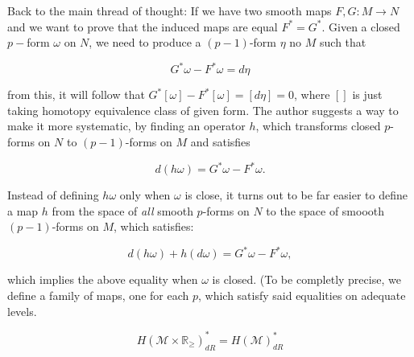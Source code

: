 \documentclass[licencjacka]{pracamgr}
\begin{document}
Back to the main thread of thought: If we have two smooth maps $F, G:
M \rightarrow N$ and we want to prove that the induced maps are equal
$F^\ast = G^\ast$. Given a closed $p-$form $\omega$ on $N$, we need to
produce a $(p-1)$-form $\eta$ no $M$ such that

\[
    G^\ast \omega - F^\ast \omega = d\eta
\]

from this, it will follow that $ G^\ast [\omega] - F^\ast [\omega] =
[d\eta] = 0$, where $[]$ is just taking homotopy equivalence class
of given form. The author suggests a way to make it more systematic,
by finding an operator $h$, which transforms closed $p$-forms on $N$
to $(p-1)$-forms on $M$ and satisfies

\[
    d(h\omega) = G^\ast \omega - F^\ast \omega.
\]

Instead of defining $h\omega$ only when $\omega$ is close, it turns
out to be far easier to define a map $h$ from the space of
\textit{all} smooth $p$-forms on $N$ to the space of smoooth
$(p-1)$-forms on $M$, which satisfies:

\[
    d(h\omega) + h(d\omega) = G^\ast \omega - F^\ast \omega ,
\]

which implies the above equality when $\omega$ is closed. (To be
completly precise, we define a family of maps, one for each $p$, which
satisfy said equalities on adequate levels.

\[
    H(\mathcal{M} \times \mathbb{R}_{\geq})_{dR}^\ast = H(\mathcal{M})_{dR}^\ast
\]

\normalsize



\end{document}
